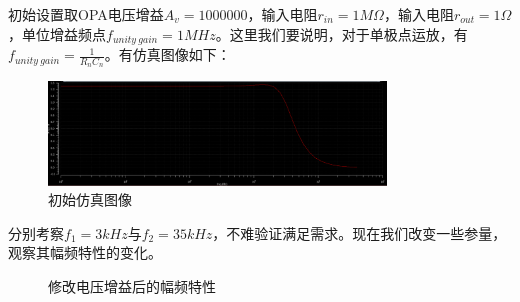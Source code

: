 \documentclass[12pt, a4paper]{article}
\begin{document}
    初始设置取OPA电压增益$A_v = 1000000$，输入电阻$r_{in} = 1M \Omega$，输入电阻$r_{out} = 1 \Omega$，单位增益频点$f_{unity \ gain} = 1MHz$。这里我们要说明，对于单极点运放，有$f_{unity \ gain} = \frac{1}{R_n C_n}$。有仿真图像如下：
     \begin{figure}[H]
    	\centering
    	\includegraphics[width = 0.8\textwidth]{OriginalPlot}
    	\caption{初始仿真图像}
    \end{figure}\par
    分别考察$f_1 = 3kHz$与$f_2 = 35kHz$，不难验证满足需求。现在我们改变一些参量，观察其幅频特性的变化。
     \begin{figure}[H]
    	\centering
    	
    	\centering
    	\caption{修改电压增益后的幅频特性}
    \end{figure}\par
\end{document}
